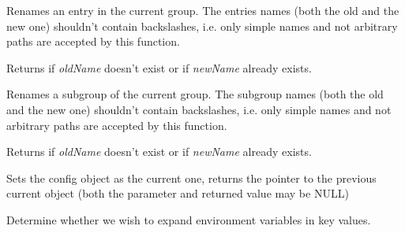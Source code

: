 

\label{wxconfigbaserenameentry}


Renames an entry in the current group. The entries names (both the old and
the new one) shouldn't contain backslashes, i.e. only simple names and not
arbitrary paths are accepted by this function.

Returns \false if {\it oldName} doesn't exist or if {\it newName} already
exists.


\label{wxconfigbaserenamegroup}


Renames a subgroup of the current group. The subgroup names (both the old and
the new one) shouldn't contain backslashes, i.e. only simple names and not
arbitrary paths are accepted by this function.

Returns \false if {\it oldName} doesn't exist or if {\it newName} already
exists.


\label{wxconfigbaseset}


Sets the config object as the current one, returns the pointer to the previous
current object (both the parameter and returned value may be NULL)


\label{wxconfigbasesetexpandenvvars}


Determine whether we wish to expand environment variables in key values.


\label{wxconfigbasesetpath}

